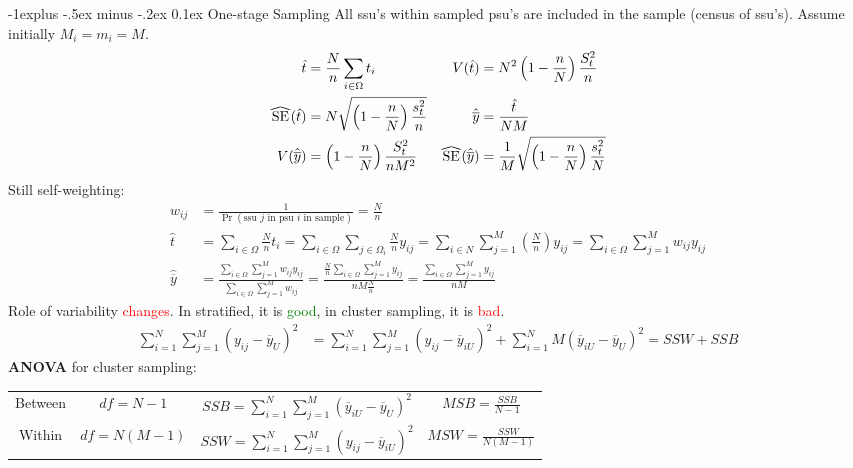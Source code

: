 \documentclass[landscape]{article}
\makeatletter
\renewcommand{\subsection}{\@startsection{subsection}{2}{0mm}%
                                {-1explus -.5ex minus -.2ex}%
                                {0.1ex}%
                                {\color{orange}\normalfont\normalsize\bfseries}}
\newcommand\reallywidehat[1]{%
\savestack{\tmpbox}{\stretchto{%
  \scaleto{%
    \scalerel*[\widthof{\ensuremath{#1}}]{\kern-.6pt\bigwedge\kern-.6pt}%
    {\rule[-\textheight/2]{1ex}{\textheight}}%
  }{\textheight}%
}{0.5ex}}%
\stackon[1pt]{#1}{\tmpbox}%
}
\makeatother
\begin{document}
\begin{multicols*}{3}
\subsection{One-stage Sampling}
All ssu's within sampled psu's are included in the sample (census of
ssu's). Assume initially $M_i = m_i = M$.
\begin{align*}
  \hat{t} & = \frac{N}{n} \sum_{i \in \Omega} t_i
  & V(\hat{t}) & = N^2 \left(1 - \frac{n}{N}\right) \frac{S_t^2}{n}
  \\ \reallywidehat{SE}(\hat{t}) & = N \sqrt{\left(1 - \frac{n}{N}\right)\frac{s_t^2}{n}}
  & \hat{\overline{y}} & = \frac{\hat{t}}{NM}
  \\ V(\hat{\overline{y}}) & = \left(1 - \frac{n}{N}\right) \frac{S_t^2}{nM^2}
  & \reallywidehat{SE}(\hat{\overline{y}}) & = \frac{1}{M} \sqrt{\left(1 - \frac{n}{N}\right)\frac{s_t^2}{N}}
\end{align*}
Still self-weighting:
\begin{align*}
  w_{ij} & = \frac{1}{\Pr(\text{ssu $j$ in psu $i$ in sample})} = \frac{N}{n}
  \\ \hat{t} & = \sum_{i \in \Omega} \frac{N}{n}t_i = \sum_{i \in \Omega} \sum_{j \in \Omega_i} \frac{N}{n} y_{ij} = \sum_{i \in N} \sum_{j=1}^{M} \left(\frac{N}{n}\right)y_{ij} = \sum_{i \in \Omega} \sum_{j = 1}^{M} w_{ij}y_{ij}
  \\ \hat{\overline{y}} & = \frac{\sum_{i \in \Omega}\sum_{j = 1}^M w_{ij}y_{ij}}{\sum_{i \in \Omega}\sum_{j = 1}^M w_{ij}} = \frac{\frac{N}{n}\sum_{i \in \Omega}\sum_{j=1}^{M}y_{ij}}{nM \frac{N}{n}} = \frac{\sum_{i \in \Omega}\sum_{j = 1}^{M}y_{ij}}{nM}
\end{align*}
Role of variability \textcolor{red}{changes}. In stratified, it is
\textcolor{green}{good}, in cluster sampling, it is
\textcolor{red}{bad}.
\begin{align*}
  \sum_{i=1}^N \sum_{j = 1}^{M} \left(y_{ij} - \overline{y}_U\right)^2 & = \sum_{i=1}^N \sum_{j=1}^{M} \left(y_{ij} - \overline{y}_{iU}\right)^2 + \sum_{i=1}^N M \left(\overline{y}_{iU} - \overline{y}_U\right)^2 = SSW + SSB
\end{align*}
\textbf{ANOVA} for cluster sampling:\\
\begin{tabular}{c | c c c}
  Between& $df =N - 1$& $SSB = \sum_{i=1}^N \sum_{j = 1}^{M} \left(\overline{y}_{iU} - \overline{y}_U\right)^2$& $MSB = \frac{SSB}{N - 1}$
  \\ Within & $df = N(M-1)$ & $SSW  = \sum_{i=1}^N \sum_{j = 1}^{M} \left(y_{ij} - \overline{y}_{iU}\right)^2$ & $MSW = \frac{SSW}{N(M-1)}$

\end{tabular}
\end{multicols*}
\end{document}
